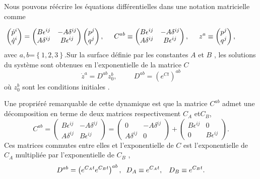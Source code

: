 \documentclass[12pt,a4paper, openany]{article}
\begin{document}
 Nous pouvons réécrire les équations différentielles dans une notation matricielle comme
 
 \begin{equation}
 	\hspace{-1cm}
 \begin{pmatrix}
 	\dot{p}^i \\
 	\dot{q}^i
 \end{pmatrix}
 =
 \begin{pmatrix}
 	B\epsilon^{ij} & -A\delta^{ij}\\
 	A\delta^{ij} & B\epsilon^{ij}
 \end{pmatrix}
 \begin{pmatrix}
 	{p}^j \\
 	{q}^j
 \end{pmatrix} ,\hspace{0.5cm}
 C^{ab}\equiv
 \begin{pmatrix}
 	B\epsilon^{ij} & -A\delta^{ij}\\
 	A\delta^{ij} & B\epsilon^{ij}
 \end{pmatrix} ,\hspace{0.5cm}
 z^a\equiv
 \begin{pmatrix}
 {p}^j \\
 {q}^j
 \end{pmatrix},
 \end{equation} 
 avec $a,b$=$\left\{1,2,3\right\}$.Sur la surface définie par les constantes $A$ et $B$ , les solutions du système sont obtenues en l'exponentielle de la matrice $C$
 \begin{equation}
 	\dot{z}^a=D^{ab}z_0^b ,\hspace{1cm} D^{ab}=\left(e^{Ct}\right)^{ab}
 \end{equation}
 où $z_0^b $ sont les conditions initiales .
 
Une propriéré remarquable de cette dynamique est que la matrice $C^{ab}$ admet une décomposition en terme de deux matrices respectivement $C_A$ et$C_B$,
\begin{equation}
	C^{ab}=
	\begin{pmatrix}
		B\epsilon^{ij} & -A\delta^{ij}\\
		A\delta^{ij} & B\epsilon^{ij}
	\end{pmatrix} 
	=
	\begin{pmatrix}
		0 & -A\delta^{ij}\\
		A\delta^{ij} & 0
	\end{pmatrix}
	+
	\begin{pmatrix}
		B\epsilon^{ij}& 0 \\
		0 & B\epsilon^{ij}	
		\end{pmatrix} .
	\end{equation} 
	Ces matrices commutes entre elles et l'exponentielle de $C$ est l'exponentielle de $C_A$ multipliée par l'exponentielle de $C_B$ ,
	\begin{equation}
		D^{ab}=\left(e^{C_{A}t}e^{C_{B}t}\right)^{ab},\hspace{0.2cm}D_A\equiv e^{C_{A}t},\hspace{0.3cm} D_B\equiv e^{C_{B}t} .
		\end{equation}
\end{document}
